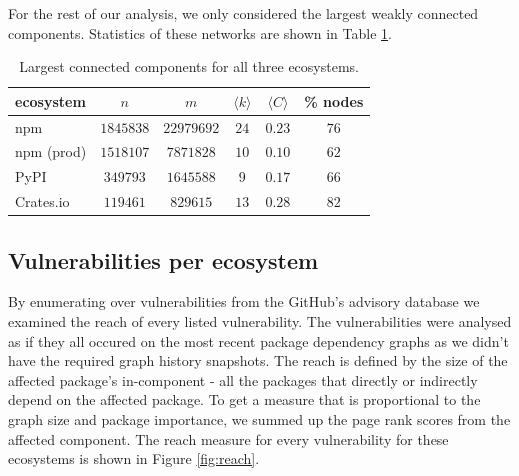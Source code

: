 \documentclass[9pt,twocolumn,twoside]{pnas-report}
\begin{document}
For the rest of our analysis, we only considered the largest weakly connected components.
Statistics of these networks are shown in Table \ref{tab:lcc_stats}.

\begin{table}[h]\centering%
	\caption{Largest connected components for all three ecosystems.}
	\begin{tabular}{l|ccccc}
		ecosystem  & $n$       & $m$        & $\langle k\rangle$ & $\langle C\rangle$ & \% nodes \\\hline
		npm        & $1845838$ & $22979692$ & $24$               & $0.23$             & $76$     \\
		npm (prod) & $1518107$ & $7871828$  & $10$               & $0.10$             & $62$     \\
		PyPI       & $349793$  & $1645588$  & $9$                & $0.17$             & $66$     \\
		Crates.io  & $119461$  & $829615$   & $13$               & $0.28$             & $82$     \\
	\end{tabular}
	\label{tab:lcc_stats}
\end{table}

\subsection*{Vulnerabilities per ecosystem}

By enumerating over vulnerabilities from the GitHub's advisory database we examined the reach of every listed vulnerability.
The vulnerabilities were analysed as if they all occured on the most recent package dependency graphs as we didn't have the required graph history snapshots.
The reach is defined by the size of the affected package's in-component - all the packages that directly or indirectly depend on the affected package.
To get a measure that is proportional to the graph size and package importance, we summed up the page rank scores from the affected component.
The reach measure for every vulnerability for these ecosystems is shown in Figure \ref{fig:reach}.
\end{document}
